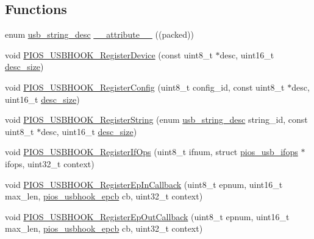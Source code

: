 \subsection*{\-Functions}
\begin{DoxyCompactItemize}
\item 
enum \hyperlink{group___p_i_o_s___u_s_b_h_o_o_k_ga5a1ae5206971f0c296fa30b24e8725da}{usb\-\_\-string\-\_\-desc} \hyperlink{group___p_i_o_s___u_s_b_h_o_o_k_ga7c85e72dd0b0db640d1db8abb5427715}{\-\_\-\-\_\-attribute\-\_\-\-\_\-} ((packed))
\item 
void \hyperlink{group___p_i_o_s___u_s_b_h_o_o_k_ga59b142c7def8bcde4564793de82198d6}{\-P\-I\-O\-S\-\_\-\-U\-S\-B\-H\-O\-O\-K\-\_\-\-Register\-Device} (const uint8\-\_\-t $\ast$desc, uint16\-\_\-t \hyperlink{pios__board__info_8h_ae5d617056baa2cb80f47bfcef73f2b69}{desc\-\_\-size})
\item 
void \hyperlink{group___p_i_o_s___u_s_b_h_o_o_k_gaf98576e0b9228288e852901754ab9759}{\-P\-I\-O\-S\-\_\-\-U\-S\-B\-H\-O\-O\-K\-\_\-\-Register\-Config} (uint8\-\_\-t config\-\_\-id, const uint8\-\_\-t $\ast$desc, uint16\-\_\-t \hyperlink{pios__board__info_8h_ae5d617056baa2cb80f47bfcef73f2b69}{desc\-\_\-size})
\item 
void \hyperlink{group___p_i_o_s___u_s_b_h_o_o_k_gab472720c22eb46c81e7f6739dc53117b}{\-P\-I\-O\-S\-\_\-\-U\-S\-B\-H\-O\-O\-K\-\_\-\-Register\-String} (enum \hyperlink{group___p_i_o_s___u_s_b_h_o_o_k_ga5a1ae5206971f0c296fa30b24e8725da}{usb\-\_\-string\-\_\-desc} string\-\_\-id, const uint8\-\_\-t $\ast$desc, uint16\-\_\-t \hyperlink{pios__board__info_8h_ae5d617056baa2cb80f47bfcef73f2b69}{desc\-\_\-size})
\item 
void \hyperlink{group___p_i_o_s___u_s_b_h_o_o_k_ga810a146080ed0e84fd2e76eeb1237cb4}{\-P\-I\-O\-S\-\_\-\-U\-S\-B\-H\-O\-O\-K\-\_\-\-Register\-If\-Ops} (uint8\-\_\-t ifnum, struct \hyperlink{structpios__usb__ifops}{pios\-\_\-usb\-\_\-ifops} $\ast$ifops, uint32\-\_\-t context)
\item 
void \hyperlink{group___p_i_o_s___u_s_b_h_o_o_k_gaab0fa8ca00730aaca31b660d2c3940b7}{\-P\-I\-O\-S\-\_\-\-U\-S\-B\-H\-O\-O\-K\-\_\-\-Register\-Ep\-In\-Callback} (uint8\-\_\-t epnum, uint16\-\_\-t max\-\_\-len, \hyperlink{group___p_i_o_s___u_s_b_h_o_o_k_ga5f7904cd3922ab7207afebe3d9ef2650}{pios\-\_\-usbhook\-\_\-epcb} cb, uint32\-\_\-t context)
\item 
void \hyperlink{group___p_i_o_s___u_s_b_h_o_o_k_gac9251a5f11fe56ac9a0e8d1405bcb322}{\-P\-I\-O\-S\-\_\-\-U\-S\-B\-H\-O\-O\-K\-\_\-\-Register\-Ep\-Out\-Callback} (uint8\-\_\-t epnum, uint16\-\_\-t max\-\_\-len, \hyperlink{group___p_i_o_s___u_s_b_h_o_o_k_ga5f7904cd3922ab7207afebe3d9ef2650}{pios\-\_\-usbhook\-\_\-epcb} cb, uint32\-\_\-t context)

\end{DoxyCompactItemize}
